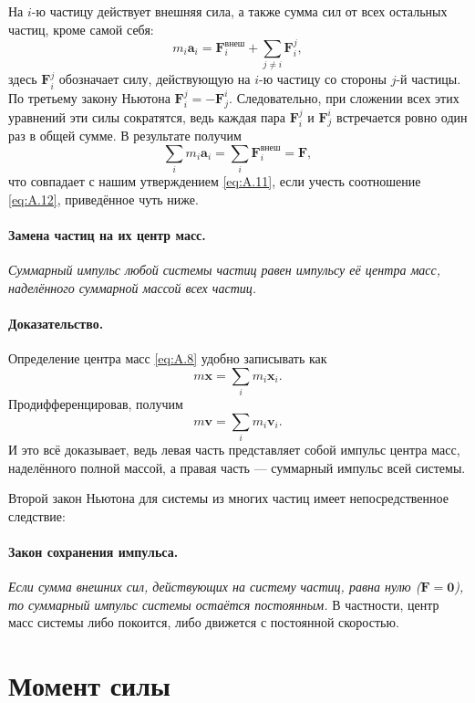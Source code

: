 На $i$-ю частицу действует внешняя сила, а также сумма сил от всех остальных частиц, кроме самой себя:
\[m_i \mathbf{a}_i=\mathbf{F}_i^{\text{внеш}}+\sum_{j \neq i} \mathbf{F}_{i}^{j},\]
здесь $\mathbf{F}_{i}^{j}$ обозначает силу, действующую на $i$-ю частицу
со стороны $j$-й частицы.
По третьему закону Ньютона $\mathbf{F}_{i}^{j}=-\mathbf{F}_{j}^{i}$.
Следовательно, при сложении всех этих уравнений эти силы
сократятся, ведь каждая пара $\mathbf{F}_{i}^{j}$ и $\mathbf{F}_{j}^{i}$
встречается ровно один раз в общей сумме.
В результате получим
\[
\sum_i m_i \mathbf{a}_i=\sum_i \mathbf{F}_i^{\text{внеш}}=\mathbf{F},
\]
что совпадает с нашим утверждением \eqref{eq:A.11}, если учесть соотношение \eqref{eq:A.12}, приведённое чуть ниже.

\paragraph{Замена частиц на их центр масс.}
\emph{Суммарный импульс любой системы частиц равен импульсу её центра масс, наделённого суммарной массой всех частиц.}

\paragraph{Доказательство.}
Определение центра масс \eqref{eq:A.8} удобно записывать как
\begin{equation}
m \mathbf{x}=\sum_i m_i \mathbf{x}_i.
\label{eq:A.12}
\end{equation}
Продифференцировав, получим
\[m \mathbf{v}=\sum_i m_i \mathbf{v}_i.\]
И это всё доказывает, ведь левая часть представляет собой импульс центра масс, наделённого полной массой,
а правая часть --- суммарный импульс всей системы.

Второй закон Ньютона для системы из многих частиц имеет непосредственное следствие:

\paragraph{Закон сохранения импульса.} \emph{Если сумма внешних сил, действующих на систему частиц, равна нулю ($\mathbf{F}=\mathbf{0}$), то суммарный импульс системы остаётся постоянным.}
В частности, центр масс системы либо покоится, либо движется с постоянной скоростью.
\label{Импульс:end}

\section{Момент силы}\label{sec:A.5}

